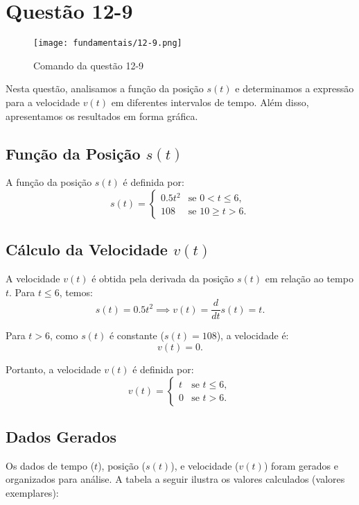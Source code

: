 \section{Questão 12-9}

\begin{figure}[H]
	\centering
	\texttt{[image: fundamentais/12-9.png]}
	\caption{Comando da questão 12-9}\label{fig:q12-9}
\end{figure}

Nesta questão, analisamos a função da posição \(s(t)\) e determinamos a expressão para a velocidade \(v(t)\) em diferentes intervalos de tempo. Além disso, apresentamos os resultados em forma gráfica.

\subsection*{Função da Posição \(s(t)\)}
A função da posição \(s(t)\) é definida por:
\[
s(t) = 
\begin{cases} 
0.5t^2 & \text{se } 0 <  t \leq 6, \\
108 & \text{se } 10 \geq t > 6.
\end{cases}
\]

\subsection*{Cálculo da Velocidade \(v(t)\)}
A velocidade \(v(t)\) é obtida pela derivada da posição \(s(t)\) em relação ao tempo \(t\). Para \(t \leq 6\), temos:
\[
s(t) = 0.5t^2 \implies v(t) = \frac{d}{dt}s(t) = t.
\]

Para \(t > 6\), como \(s(t)\) é constante (\(s(t) = 108\)), a velocidade é:
\[
v(t) = 0.
\]

Portanto, a velocidade \(v(t)\) é definida por:
\[
v(t) = 
\begin{cases} 
t & \text{se } t \leq 6, \\
0 & \text{se } t > 6.
\end{cases}
\]

\subsection*{Dados Gerados}
Os dados de tempo (\(t\)), posição (\(s(t)\)), e velocidade (\(v(t)\)) foram gerados e organizados para análise. A tabela a seguir ilustra os valores calculados (valores exemplares):

